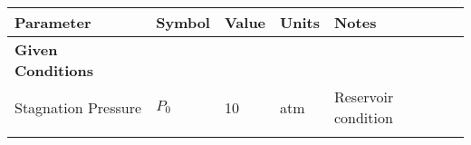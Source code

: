 \begin{longtable}[]{@{}lllll@{}}
\toprule
\begin{minipage}[b]{0.23\columnwidth}\raggedright
Parameter\strut
\end{minipage} & \begin{minipage}[b]{0.07\columnwidth}\raggedright
Symbol\strut
\end{minipage} & \begin{minipage}[b]{0.12\columnwidth}\raggedright
Value\strut
\end{minipage} & \begin{minipage}[b]{0.06\columnwidth}\raggedright
Units\strut
\end{minipage} & \begin{minipage}[b]{0.38\columnwidth}\raggedright
Notes\strut
\end{minipage}\tabularnewline
\midrule
\endhead
\begin{minipage}[t]{0.23\columnwidth}\raggedright
\textbf{Given Conditions}\strut
\end{minipage} & \begin{minipage}[t]{0.07\columnwidth}\raggedright
\strut
\end{minipage} & \begin{minipage}[t]{0.12\columnwidth}\raggedright
\strut
\end{minipage} & \begin{minipage}[t]{0.06\columnwidth}\raggedright
\strut
\end{minipage} & \begin{minipage}[t]{0.38\columnwidth}\raggedright
\strut
\end{minipage}\tabularnewline
\begin{minipage}[t]{0.23\columnwidth}\raggedright
Stagnation Pressure\strut
\end{minipage} & \begin{minipage}[t]{0.07\columnwidth}\raggedright
\(P_0\)\strut
\end{minipage} & \begin{minipage}[t]{0.12\columnwidth}\raggedright
10\strut
\end{minipage} & \begin{minipage}[t]{0.06\columnwidth}\raggedright
atm\strut
\end{minipage} & \begin{minipage}[t]{0.38\columnwidth}\raggedright
Reservoir condition\strut
\end{minipage}\tabularnewline
\begin{minipage}[t]{0.23\columnwidth}\raggedright

\end{minipage}
\end{longtable}
